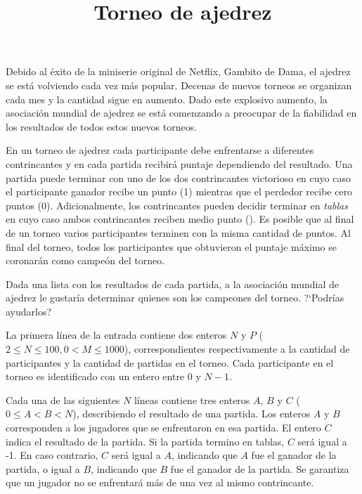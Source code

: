 \documentclass{oci}
\title{Torneo de ajedrez}
\begin{document}
\begin{problemDescription}
  Debido al éxito de la miniserie original de Netflix, Gambito de Dama, el ajedrez
  se está volviendo cada vez más popular.
  Decenas de nuevos torneos se organizan cada mes y la cantidad sigue en aumento.
  Dado este explosivo aumento, la asociación mundial de ajedrez se está comenzando a preocupar
  de la fiabilidad en los resultados de todos estos nuevos torneos.

  En un torneo de ajedrez cada participante debe enfrentarse a diferentes contrincantes y en cada
  partida recibirá puntaje dependiendo del resultado.
  Una partida puede terminar con uno de los dos contrincantes victorioso en cuyo caso el
  participante ganador recibe un punto (1) mientras que el perdedor recibe cero puntos (0).
  Adicionalmente, los contrincantes pueden decidir terminar en \emph{tablas} en cuyo caso ambos
  contrincantes reciben medio punto ().
  Es posible
  que al final de un torneo varios participantes terminen con la misma cantidad de puntos.
  Al final del torneo, todos los participantes que obtuvieron el puntaje máximo se coronarán
  como campeón del torneo.

  Dada una lista con los resultados de cada partida, a la asociación
  mundial de ajedrez le gustaría determinar quienes son los campeones del torneo.
  ?`Podrías ayudarlos?
\end{problemDescription}

\begin{inputDescription}
  La primera línea de la entrada contiene dos enteros $N$ y $P$
  ($2 \leq N \leq 100, 0 < M \leq 1000$),
  correspondientes respectivamente a la cantidad de participantes y la cantidad de partidas
  en el torneo.
  Cada participante en el torneo es identificado con un entero entre 0 y $N-1$.

  Cada una de las siguientes $N$ líneas contiene tres enteros $A$, $B$ y $C$
  ($0\leq A < B < N$), describiendo el resultado de una partida.
  Los enteros $A$ y $B$ corresponden a los jugadores que se enfrentaron en esa partida.
  El entero $C$ indica el resultado de la partida.
  Si la partida termino en tablas, $C$ será igual a {-1}.
  En caso contrario, $C$ será igual a $A$, indicando que $A$ fue el ganador de la partida, o igual
  a $B$, indicando que $B$ fue el ganador de la partida.
  Se garantiza que un jugador no se enfrentará más de una vez al mismo contrincante.
\end{inputDescription}
\end{document}
